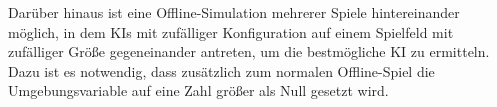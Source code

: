 Darüber hinaus ist eine Offline-Simulation mehrerer Spiele hintereinander möglich, in dem \ac{KI}s mit zufälliger
Konfiguration auf einem Spielfeld mit zufälliger Größe gegeneinander antreten, um die bestmögliche \ac{KI} zu ermitteln.
Dazu ist es notwendig, dass zusätzlich zum normalen Offline-Spiel die Umgebungsvariable  auf
eine Zahl größer als Null gesetzt wird.